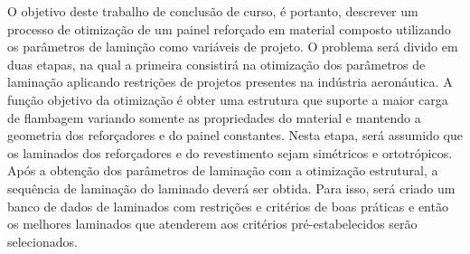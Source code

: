 O objetivo deste trabalho de conclusão de curso, é portanto, descrever um processo de otimização de um painel reforçado em material composto utilizando os parâmetros de laminção como variáveis de projeto. O problema será divido em duas etapas, na qual a primeira consistirá na otimização dos parâmetros de laminação aplicando restrições de projetos presentes na indústria aeronáutica. A função objetivo da otimização é obter uma estrutura que suporte a maior carga de flambagem variando somente as propriedades do material e mantendo a geometria dos reforçadores e do painel constantes. Nesta etapa, será assumido que os laminados dos reforçadores e do revestimento sejam simétricos e ortotrópicos. Após a obtenção dos parâmetros de laminação com a otimização estrutural, a sequência de laminação do laminado deverá ser obtida. Para isso, será criado um banco de dados de laminados com restrições e critérios de boas práticas e então os melhores laminados que atenderem aos critérios pré-estabelecidos serão selecionados. 



